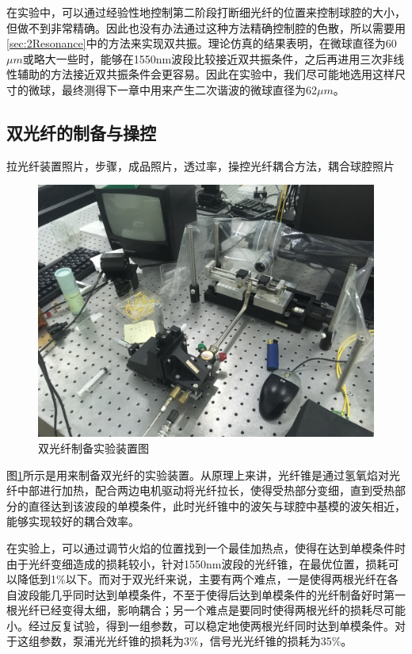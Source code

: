 \documentclass[UTF8,a4paper,cs4size,hyperref]{ctexart}
\begin{document}
在实验中，可以通过经验性地控制第二阶段打断细光纤的位置来控制球腔的大小，但做不到非常精确。因此也没有办法通过这种方法精确控制腔的色散，所以需要用\ref{sec:2Resonance}中的方法来实现双共振。理论仿真的结果表明，在微球直径为60$\mu m$或略大一些时，能够在1550nm波段比较接近双共振条件，之后再进用三次非线性辅助的方法接近双共振条件会更容易。因此在实验中，我们尽可能地选用这样尺寸的微球，最终测得下一章中用来产生二次谐波的微球直径为62$\mu m$。


\subsection{双光纤的制备与操控}

拉光纤装置照片，步骤，成品照片，透过率，操控光纤耦合方法，耦合球腔照片

\begin{figure}
\centering
\includegraphics[width=16cm ]{Setup_pullingFiber}
\caption{双光纤制备实验装置图}
\label{pic:Setup_pullingFiber}
\end{figure}

图\ref{pic:Setup_pullingFiber}所示是用来制备双光纤的实验装置。从原理上来讲，光纤锥是通过氢氧焰对光纤中部进行加热，配合两边电机驱动将光纤拉长，使得受热部分变细，直到受热部分的直径达到该波段的单模条件，此时光纤锥中的波矢与球腔中基模的波矢相近，能够实现较好的耦合效率。

在实验上，可以通过调节火焰的位置找到一个最佳加热点，使得在达到单模条件时由于光纤变细造成的损耗较小，针对1550nm波段的光纤锥，在最优位置，损耗可以降低到1$\%$以下。而对于双光纤来说，主要有两个难点，一是使得两根光纤在各自波段能几乎同时达到单模条件，不至于使得后达到单模条件的光纤制备好时第一根光纤已经变得太细，影响耦合；另一个难点是要同时使得两根光纤的损耗尽可能小。经过反复试验，得到一组参数，可以稳定地使两根光纤同时达到单模条件。对于这组参数，泵浦光光纤锥的损耗为3$\%$，信号光光纤锥的损耗为35$\%$。
\end{document}
